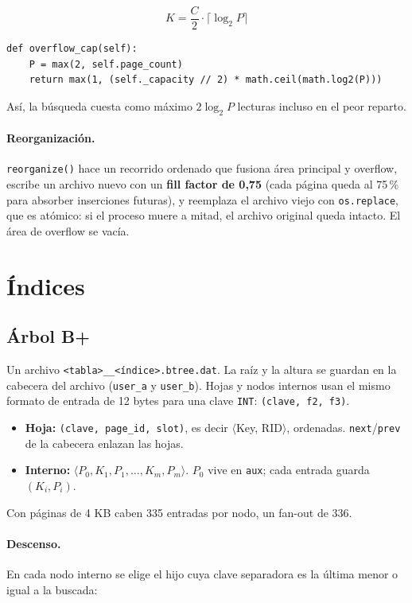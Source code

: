 \documentclass[11pt,a4paper]{article}
\newcommand{\code}[1]{\texttt{#1}}
\begin{document}
\[
K = \frac{C}{2} \cdot \lceil \log_2 P \rceil
\]

\begin{lstlisting}
def overflow_cap(self):
    P = max(2, self.page_count)
    return max(1, (self._capacity // 2) * math.ceil(math.log2(P)))
\end{lstlisting}

Así, la búsqueda cuesta como máximo $2 \log_2 P$ lecturas incluso en el peor reparto.

\paragraph{Reorganización.} \code{reorganize()} hace un recorrido ordenado que
fusiona área principal y overflow, escribe un archivo nuevo con un \textbf{fill factor
de 0,75} (cada página queda al 75\,\% para absorber inserciones futuras), y reemplaza
el archivo viejo con \code{os.replace}, que es atómico: si el proceso muere a mitad,
el archivo original queda intacto. El área de overflow se vacía.

\section{Índices}

\subsection{Árbol B+}

Un archivo \code{<tabla>\_\_<índice>.btree.dat}. La raíz y la altura se guardan en la
cabecera del archivo (\code{user\_a} y \code{user\_b}). Hojas y nodos internos usan el
mismo formato de entrada de 12 bytes para una clave \code{INT}: \code{(clave, f2, f3)}.

\begin{itemize}
  \item \textbf{Hoja:} \code{(clave, page\_id, slot)}, es decir $\langle$Key, RID$\rangle$,
        ordenadas. \code{next}/\code{prev} de la cabecera enlazan las hojas.
  \item \textbf{Interno:} $\langle P_0, K_1, P_1, \dots, K_m, P_m \rangle$. $P_0$ vive en
        \code{aux}; cada entrada guarda $(K_i, P_i)$.
\end{itemize}

Con páginas de 4 KB caben 335 entradas por nodo, un fan-out de 336.

\paragraph{Descenso.} En cada nodo interno se elige el hijo cuya clave separadora es
la última menor o igual a la buscada:
\end{document}
